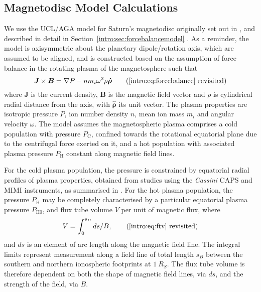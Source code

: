 \subsection{Magnetodisc Model Calculations}\label{compress:sec:model}
We use the UCL/AGA model for Saturn's magnetodisc originally set out in \citet{achilleos2010a}, and described in detail in Section~\ref{intro:sec:forcebalancemodel} . As a reminder, the model is axisymmetric about the planetary dipole/rotation axis, which are assumed to be aligned, and is constructed based on the assumption of force balance in the rotating plasma of the magnetosphere such that 
\begin{equation*}\label{compress:eq:forcebalance}
\boldsymbol{J} \times \boldsymbol{B} = \nabla P - nm_i\omega^2\rho\boldsymbol{\hat{\rho}} \tag{\ref{intro:eq:forcebalance} revisited}
\end{equation*}
where $\boldsymbol{J}$ is the current density, $\boldsymbol{B}$ is the magnetic field vector and $\rho$ is cylindrical radial distance from the axis, with $\boldsymbol{\hat{\rho}}$ its unit vector. The plasma properties are isotropic pressure $P$, ion number density $n$, mean ion mass $m_i$ and angular velocity $\omega$. The model assumes the magnetospheric plasma comprises a cold population with pressure $P_\mathrm{C}$, confined towards the rotational equatorial plane due to the centrifugal force exerted on it, and a hot population with associated plasma pressure $P_\mathrm{H}$ constant along magnetic field lines. 

For the cold plasma population, the pressure is constrained by equatorial radial profiles of plasma properties, obtained from studies using the \textit{Cassini} CAPS and MIMI instruments, as summarised in \citet{achilleos2010a,achilleos2010b}. For the hot plasma population, the pressure $P_\mathrm{H}$ may be completely characterised by a particular equatorial plasma pressure $P_\mathrm{H0}$, and flux tube volume $V$ per unit of magnetic flux, where
\begin{equation*}\label{compress:eq:ftv}
V = \int_{0}^{s_{B}} ds/B, \tag{\ref{intro:eq:ftv} revisited}
\end{equation*}
and $ds$ is an element of arc length along the magnetic field line. The integral limits represent measurement along a field line of total length $s_B$ between the southern and northern ionospheric footprints at $\SI{1}{R_S}$. The flux tube volume is therefore dependent on both the shape of magnetic field lines, via $ds$, and the strength of the field, via $B$. 


